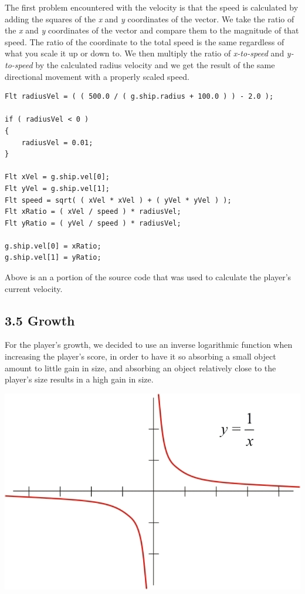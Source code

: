 \documentclass[12pt]{report}
\begin{document}
\medskip
The first problem encountered with the velocity is that the speed is calculated by adding the squares of the \textit{x} and \textit{y} coordinates of the vector. We take the ratio of the \textit{x} and \textit{y} coordinates of the vector and compare them to the magnitude of that speed. The ratio of the coordinate to the total speed is the same regardless of what you scale it up or down to. We then multiply the ratio of \textit{x-to-speed} and \textit{y-to-speed} by the calculated radius velocity and we get the result of the same directional movement with a properly scaled speed. \bigskip

\begin{lstlisting}
Flt radiusVel = ( ( 500.0 / ( g.ship.radius + 100.0 ) ) - 2.0 );

if ( radiusVel < 0 )
{
	radiusVel = 0.01;
}

Flt xVel = g.ship.vel[0];
Flt yVel = g.ship.vel[1];
Flt speed = sqrt( ( xVel * xVel ) + ( yVel * yVel ) );
Flt xRatio = ( xVel / speed ) * radiusVel;
Flt yRatio = ( yVel / speed ) * radiusVel;

g.ship.vel[0] = xRatio;
g.ship.vel[1] = yRatio;
\end{lstlisting}

\noindent Above is an a portion of the source code that was used to calculate the player's current velocity.

\newpage
\subsection*{3.5 Growth}
For the player's growth, we decided to use an inverse logarithmic function when increasing the player's score, in order to have it so absorbing a small object amount to little gain in size, and absorbing an object relatively close to the player's size results in a high gain in size. \bigskip

\includegraphics[width=\textwidth]{inverse_log_graph}
\end{document}
